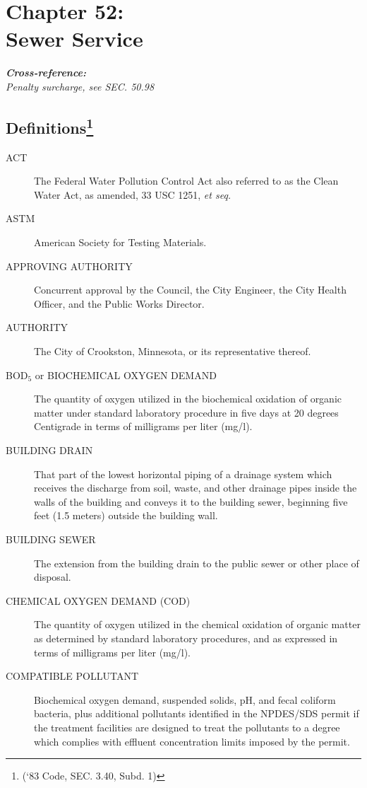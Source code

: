 \chapter*{Chapter 52: \\
	Sewer Service}
    \vfill
    \minitoc
    \textbf{\emph{{Cross-reference:}}}\\
    \indent\emph{Penalty surcharge, see SEC. 50.98}
    \pagebreak



\section{Definitions\footnote{(‘83 Code, SEC. 3.40, Subd. 1)}}
\begin{description}
\item[ACT] The Federal Water Pollution Control Act also referred to as the Clean Water Act, as amended, 33 USC 1251, \emph{et seq.}
\item[ASTM] American Society for Testing Materials.
\item[APPROVING AUTHORITY] Concurrent approval by the Council, the City Engineer, the City Health Officer, and the Public Works Director.
\item[AUTHORITY] The City of Crookston, Minnesota, or its representative thereof.
\item[BOD$_{5}$ or BIOCHEMICAL OXYGEN DEMAND] The quantity of oxygen utilized in the biochemical oxidation of organic matter under standard laboratory procedure in five days at 20 degrees Centigrade in terms of milligrams per liter (mg/l).
\item[BUILDING DRAIN] That part of the lowest horizontal piping of a drainage system which receives the discharge from soil, waste, and other drainage pipes inside the walls of the building and conveys it to the building sewer, beginning five feet (1.5 meters) outside the building wall.
\item[BUILDING SEWER] The extension from the building drain to the public sewer or other place of disposal.
\item[CHEMICAL OXYGEN DEMAND (COD)] The quantity of oxygen utilized in the chemical oxidation of organic matter as determined by standard laboratory procedures, and as expressed in terms of milligrams per liter (mg/l).
\item[COMPATIBLE POLLUTANT] Biochemical oxygen demand, suspended solids, pH, and fecal coliform bacteria, plus additional pollutants identified in the NPDES/SDS permit if the treatment facilities are designed to treat the pollutants to a degree which complies with effluent concentration limits imposed by the permit.

\end{description}
